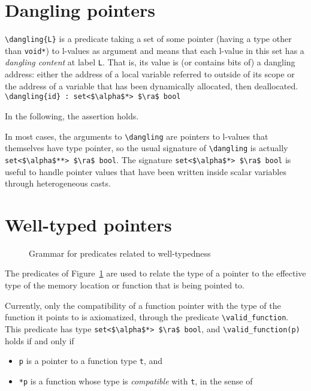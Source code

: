 \section{Dangling pointers}
\label{sec:dangling_pointers}
\lstinline|\dangling{L}|
is a predicate taking a set of some pointer
(having a type other than \lstinline|void*|) to l-values as
argument and means that each l-value in this set has a \emph{dangling
  content} at label \lstinline|L|. That is, its value is (or contains bits
of) a dangling address: either the address of a local
variable referred to outside of its scope or the address of a variable that
has been dynamically allocated, then deallocated.
\\ \makebox[5mm]{} \lstinline|\dangling{id} : set<$\alpha$*> $\ra$ bool|

\begin{example}
  In the following, the assertion holds.
\end{example}

In most cases, the arguments to \lstinline|\dangling| are pointers to
l-values that themselves have type pointer, so the usual signature
of \lstinline|\dangling| is actually
\lstinline|set<$\alpha$**> $\ra$ bool|.
The signature \lstinline|set<$\alpha$*> $\ra$ bool| is useful to handle
pointer values that have been written inside scalar variables through
heterogeneous casts.


\section{Well-typed pointers}
\label{sec:welltyped}
\experimental
{}

\begin{figure}[h]
  \begin{cadre}
      
    \end{cadre}
  \caption{Grammar for predicates related to well-typedness }
\label{fig:gram:welltyped}
\end{figure}

The predicates of Figure~\ref{fig:gram:welltyped} are used to relate
the type of a pointer to the effective type of the memory location or function
that is being pointed to.

Currently, only the compatibility of a function pointer with the type of
the function it points to is axiomatized, through the predicate
\lstinline|\valid_function|. This predicate has type
\lstinline|set<$\alpha$*> $\ra$ bool|,
and \lstinline|\valid_function(p)| holds if and only if
\begin{itemize}
\item \lstinline|p| is a pointer to a function type \lstinline|t|, and
\item \lstinline|*p| is a function whose type is \emph{compatible}
  with \lstinline|t|, in the sense of \cite[\S6.2.7]{standardc99}
\end{itemize}

